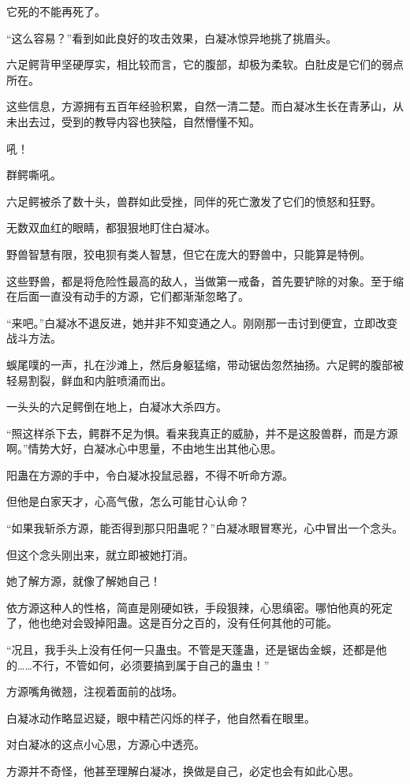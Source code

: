 \begin{this_body}
它死的不能再死了。

“这么容易？”看到如此良好的攻击效果，白凝冰惊异地挑了挑眉头。

六足鳄背甲坚硬厚实，相比较而言，它的腹部，却极为柔软。白肚皮是它们的弱点所在。

这些信息，方源拥有五百年经验积累，自然一清二楚。而白凝冰生长在青茅山，从未出去过，受到的教导内容也狭隘，自然懵懂不知。

吼！

群鳄嘶吼。

六足鳄被杀了数十头，兽群如此受挫，同伴的死亡激发了它们的愤怒和狂野。

无数双血红的眼睛，都狠狠地盯住白凝冰。

野兽智慧有限，狡电狈有类人智慧，但它在庞大的野兽中，只能算是特例。

这些野兽，都是将危险性最高的敌人，当做第一戒备，首先要铲除的对象。至于缩在后面一直没有动手的方源，它们都渐渐忽略了。

“来吧。”白凝冰不退反进，她并非不知变通之人。刚刚那一击讨到便宜，立即改变战斗方法。

蜈尾噗的一声，扎在沙滩上，然后身躯猛缩，带动锯齿忽然抽扬。六足鳄的腹部被轻易割裂，鲜血和内脏喷涌而出。

一头头的六足鳄倒在地上，白凝冰大杀四方。

“照这样杀下去，鳄群不足为惧。看来我真正的威胁，并不是这股兽群，而是方源啊。”情势大好，白凝冰心中思量，不由地生出其他心思。

阳蛊在方源的手中，令白凝冰投鼠忌器，不得不听命方源。

但他是白家天才，心高气傲，怎么可能甘心认命？

“如果我斩杀方源，能否得到那只阳蛊呢？”白凝冰眼冒寒光，心中冒出一个念头。

但这个念头刚出来，就立即被她打消。

她了解方源，就像了解她自己！

依方源这种人的性格，简直是刚硬如铁，手段狠辣，心思缜密。哪怕他真的死定了，他也绝对会毁掉阳蛊。这是百分之百的，没有任何其他的可能。

“况且，我手头上没有任何一只蛊虫。不管是天蓬蛊，还是锯齿金蜈，还都是他的……不行，不管如何，必须要搞到属于自己的蛊虫！”

方源嘴角微翘，注视着面前的战场。

白凝冰动作略显迟疑，眼中精芒闪烁的样子，他自然看在眼里。

对白凝冰的这点小心思，方源心中透亮。

方源并不奇怪，他甚至理解白凝冰，换做是自己，必定也会有如此心思。


\end{this_body}
